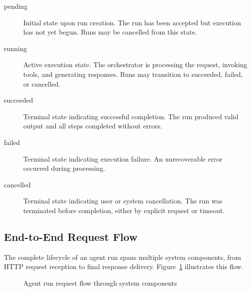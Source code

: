 \begin{description}
    \item[pending] Initial state upon run creation. The run has been accepted but execution has not yet begun. Runs may be cancelled from this state.
    
    \item[running] Active execution state. The orchestrator is processing the request, invoking tools, and generating responses. Runs may transition to succeeded, failed, or cancelled.
    
    \item[succeeded] Terminal state indicating successful completion. The run produced valid output and all steps completed without errors.
    
    \item[failed] Terminal state indicating execution failure. An unrecoverable error occurred during processing.
    
    \item[cancelled] Terminal state indicating user or system cancellation. The run was terminated before completion, either by explicit request or timeout.
\end{description}

\subsection{End-to-End Request Flow}

The complete lifecycle of an agent run spans multiple system components, from HTTP request reception to final response delivery. Figure~\ref{fig:request-flow} illustrates this flow.

\begin{figure}[htbp]
\centering
{}
\caption{Agent run request flow through system components}
\label{fig:request-flow}
\end{figure}

